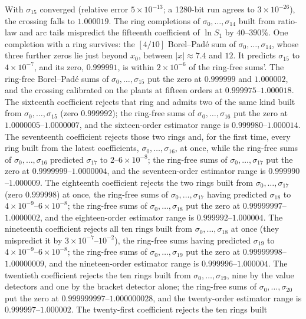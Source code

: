 \documentclass{amsart}
\numberwithin{equation}{section}
\theoremstyle{plain}
\theoremstyle{definition}
\theoremstyle{remark}
\begin{document}
With $\sigma_{15}$ converged (relative error $5\times10^{-13}$; a 1280-bit run agrees to $3\times10^{-26}$), the crossing
falls to $1.000019$. The ring completions of $\sigma_0,\dots,\sigma_{14}$ built from ratio-law and arc tails mispredict
the fifteenth coefficient of $\ln S_1$ by $40$--$390\%$. One completion with a ring survives: the $[4/10]$ Borel--Pad\'e
sum of $\sigma_0,\dots,\sigma_{14}$, whose three further zeros lie just beyond $x_0$, between $|x| \approx 7.4$ and $12$.
It predicts $\sigma_{15}$ to $4\times10^{-7}$, and its zero, $0.999991$, is within $2\times10^{-6}$ of the ring-free
sums'. The ring-free Borel--Pad\'e sums of $\sigma_0,\dots,\sigma_{15}$ put the zero at $0.999999$ and $1.000002$, and the
crossing calibrated on the plants at fifteen orders at $0.999975$--$1.000018$. The sixteenth coefficient rejects that
ring and admits two of the same kind built from $\sigma_0,\dots,\sigma_{15}$ (zero $0.999992$); the ring-free sums of
$\sigma_0,\dots,\sigma_{16}$ put the zero at $1.0000005$--$1.0000007$, and
the sixteen-order estimator range is $0.999980$--$1.000014$. The seventeenth coefficient rejects those two rings and,
for the first time, every ring built from the latest coefficients, $\sigma_0,\dots,\sigma_{16}$, at once, while the
ring-free sums of $\sigma_0,\dots,\sigma_{16}$ predicted $\sigma_{17}$ to $2$--$6\times10^{-8}$; the ring-free sums of
$\sigma_0,\dots,\sigma_{17}$ put the zero at $0.9999999$--$1.0000004$, and
the seventeen-order estimator range is $0.999990$--$1.000009$. The eighteenth coefficient rejects the two rings built
from $\sigma_0,\dots,\sigma_{17}$ (zero $0.999998$) at once, the ring-free sums of $\sigma_0,\dots,\sigma_{17}$ having
predicted $\sigma_{18}$ to $4\times10^{-9}$--$6\times10^{-8}$; the ring-free sums of $\sigma_0,\dots,\sigma_{18}$ put the
zero at $0.99999997$--$1.0000002$, and the eighteen-order estimator range is $0.999992$--$1.000004$. The nineteenth
coefficient rejects all ten rings built from $\sigma_0,\dots,\sigma_{18}$ at once (they mispredict it by
$3\times10^{-7}$--$10^{-2}$), the ring-free sums having predicted $\sigma_{19}$ to $4\times10^{-9}$--$6\times10^{-8}$; the
ring-free sums of $\sigma_0,\dots,\sigma_{19}$ put the zero at $0.99999998$--$1.00000009$, and
the nineteen-order estimator range is $0.999996$--$1.000004$. The twentieth coefficient rejects the ten rings built
from $\sigma_0,\dots,\sigma_{19}$, nine by the value detectors and one by the bracket detector alone; the ring-free sums
of $\sigma_0,\dots,\sigma_{20}$ put the zero at $0.999999997$--$1.000000028$, and
the twenty-order estimator range is $0.999997$--$1.000002$. The twenty-first coefficient rejects the ten rings built
\end{document}
